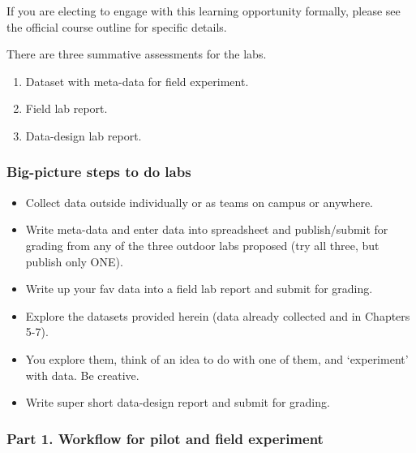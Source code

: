 \documentclass[
]{book}
\providecommand{\tightlist}{%
  \setlength{\itemsep}{0pt}\setlength{\parskip}{0pt}}
\begin{document}
If you are electing to engage with this learning opportunity formally, please see the official course outline for specific details.

There are three summative assessments for the labs.

\begin{enumerate}
\def\labelenumi{\arabic{enumi}.}
\tightlist
\item
  Dataset with meta-data for field experiment.\\
\item
  Field lab report.\\
\item
  Data-design lab report.
\end{enumerate}

\hypertarget{big-picture-steps-to-do-labs}{%
\subsubsection*{Big-picture steps to do labs}\label{big-picture-steps-to-do-labs}}

\begin{itemize}
\item
  Collect data outside individually or as teams on campus or anywhere.\\
\item
  Write meta-data and enter data into spreadsheet and publish/submit for grading from any of the three outdoor labs proposed (try all three, but publish only ONE).\\
\item
  Write up your fav data into a field lab report and submit for grading.
\item
  Explore the datasets provided herein (data already collected and in Chapters 5-7).\\
\item
  You explore them, think of an idea to do with one of them, and `experiment' with data. Be creative.\\
\item
  Write super short data-design report and submit for grading.
\end{itemize}

\hypertarget{part-1.-workflow-for-pilot-and-field-experiment}{%
\subsubsection*{Part 1. Workflow for pilot and field experiment}\label{part-1.-workflow-for-pilot-and-field-experiment}}
\end{document}
